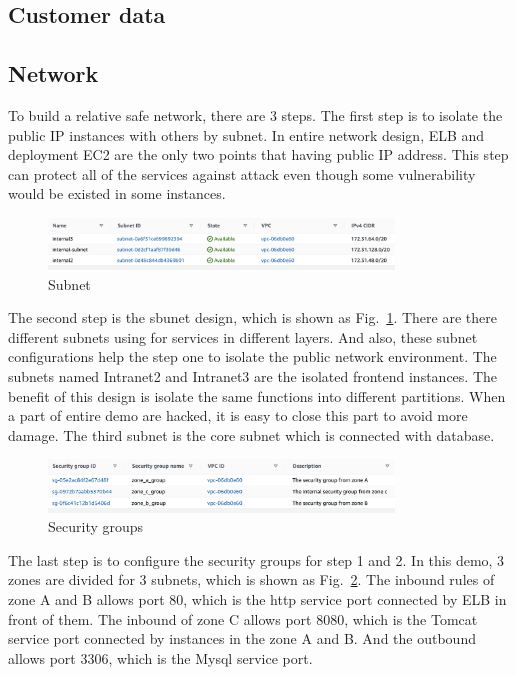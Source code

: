 \documentclass[conference]{IEEEtran}
\begin{document}
\subsection{Customer data}


\subsection{Network}

To build a relative safe network, there are 3 steps. The first step is to isolate the public IP instances with others by subnet. In entire network design, 
ELB and deployment EC2 are the only two points that having public IP address. This step can protect all of the services against attack even though some vulnerability 
would be existed in some instances.

\begin{figure}[htbp]
    \centerline{\includegraphics[width=260pt]{images/subnet.png}}
    \caption{Subnet}
    \label{subnet}
\end{figure}

The second step is the sbunet design, which is shown as Fig.~\ref{subnet}. There are there different subnets using for services in different layers. And also, 
these subnet configurations help the step one to isolate the public network environment. The subnets named Intranet2 and Intranet3 are the isolated frontend 
instances. The benefit of this design is isolate the same functions into different partitions. When a part of entire demo are hacked, it is easy 
to close this part to avoid more damage. The third subnet is the core subnet which is connected with database.

\begin{figure}[htbp]
    \centerline{\includegraphics[width=260pt]{images/security.png}}
    \caption{Security groups}
    \label{Security}
\end{figure}

The last step is to configure the security groups for step 1 and 2. In this demo, 3 zones are divided for 3 subnets, which is shown as Fig.~\ref{Security}. The inbound 
rules of zone A and B allows port 80, which is the http service port connected by ELB in front of them. The inbound of zone C allows port 8080, which is the Tomcat 
service port connected by instances in the zone A and B. And the outbound allows port 3306, which is the Mysql service port.
\end{document}
